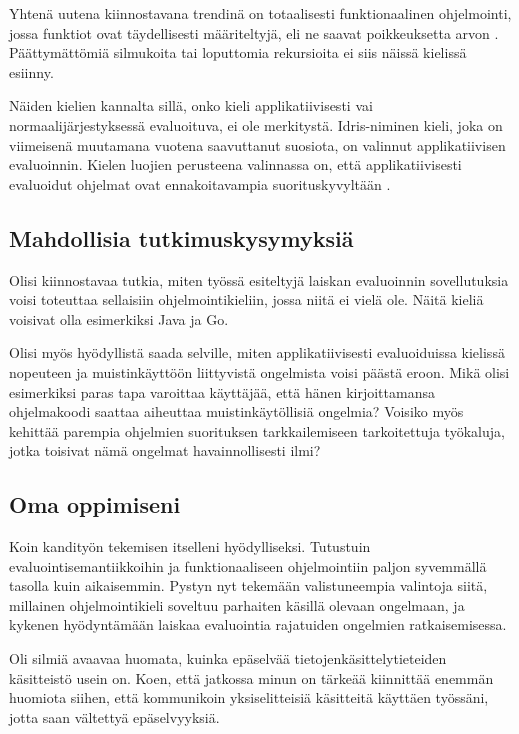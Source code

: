 Yhtenä uutena kiinnostavana trendinä on totaalisesti funktionaalinen ohjelmointi, jossa funktiot ovat täydellisesti määriteltyjä, eli ne saavat poikkeuksetta arvon \citep{turner2004total}. Päättymättömiä silmukoita tai loputtomia rekursioita ei siis näissä kielissä esiinny.

Näiden kielien kannalta sillä, onko kieli applikatiivisesti vai normaalijärjestyksessä evaluoituva, ei ole merkitystä. Idris-niminen kieli, joka on viimeisenä muutamana vuotena saavuttanut suosiota, on valinnut applikatiivisen evaluoinnin. Kielen luojien perusteena valinnassa on, että applikatiivisesti evaluoidut ohjelmat ovat ennakoitavampia suorituskyvyltään \citep{idrisfaqwhynotlazy}.

\subsection{Mahdollisia tutkimuskysymyksiä}
Olisi kiinnostavaa tutkia, miten työssä esiteltyjä laiskan evaluoinnin sovellutuksia voisi toteuttaa sellaisiin ohjelmointikieliin, jossa niitä ei vielä ole. Näitä kieliä voisivat olla esimerkiksi Java ja Go.

Olisi myös hyödyllistä saada selville, miten applikatiivisesti evaluoiduissa kielissä nopeuteen ja muistinkäyttöön liittyvistä ongelmista voisi päästä eroon. Mikä olisi esimerkiksi paras tapa varoittaa käyttäjää, että hänen kirjoittamansa ohjelmakoodi saattaa aiheuttaa muistinkäytöllisiä ongelmia? Voisiko myös kehittää parempia ohjelmien suorituksen tarkkailemiseen tarkoitettuja työkaluja, jotka toisivat nämä ongelmat havainnollisesti ilmi?

\subsection{Oma oppimiseni}

Koin kandityön tekemisen itselleni hyödylliseksi. Tutustuin evaluointisemantiikkoihin ja funktionaaliseen ohjelmointiin paljon syvemmällä tasolla kuin aikaisemmin. Pystyn nyt tekemään valistuneempia valintoja siitä, millainen ohjelmointikieli soveltuu parhaiten käsillä olevaan ongelmaan, ja kykenen hyödyntämään laiskaa evaluointia rajatuiden ongelmien ratkaisemisessa.

Oli silmiä avaavaa huomata, kuinka epäselvää tietojenkäsittelytieteiden käsitteistö usein on. Koen, että jatkossa minun on tärkeää kiinnittää enemmän huomiota siihen, että kommunikoin yksiselitteisiä käsitteitä käyttäen työssäni, jotta saan vältettyä epäselvyyksiä.